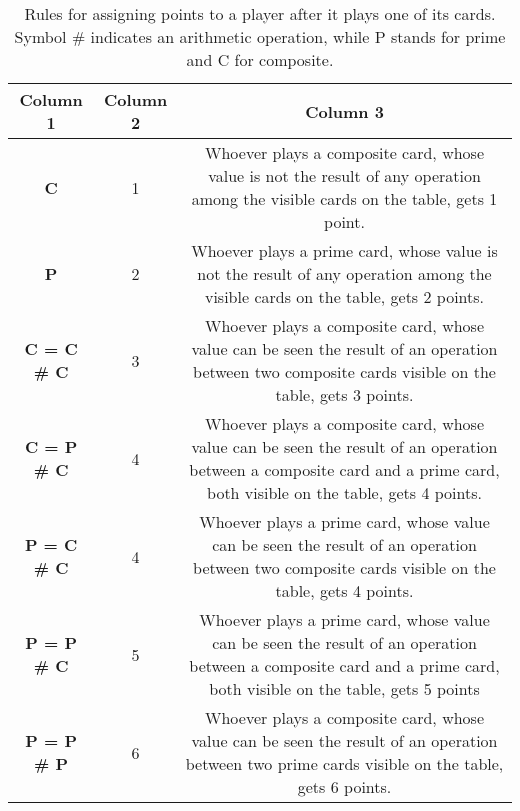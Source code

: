 \begin{table}[!ht]
	\setlength\extrarowheight{2pt} %
	\begin{tabularx}{\linewidth}{|c|c|C|}
		\hline
		\textbf{Column 1} & \textbf{Column 2} & \textbf{Column 3}  \\
		\hline
		
		\hline
		\textbf{C} & 1  &  Whoever plays a composite card, whose value is not the result of any operation among the visible cards on the table, gets 1 point. \\
		\hline
		\textbf{P}& 2 &  Whoever plays a prime card, whose value is not the result of any operation among the visible cards on the table, gets 2 points. \\
		\hline
		\textbf{C = C \# C}& 3 &  Whoever plays a composite card, whose value can be seen the result of an operation between two composite cards visible on the table, gets 3 points. \\
		\hline
		\textbf{C = P \# C}& 4 & Whoever plays a composite card, whose value can be seen the result of an operation between a composite card and a prime card, both visible on the table, gets 4 points. \\
		\hline
		\textbf{P = C \# C}& 4 &  Whoever plays a prime card, whose value can be seen the result of an operation between two composite cards visible on the table, gets 4 points. \\
		\hline
		\textbf{P = P \# C}& 5 & Whoever plays a prime card, whose value can be seen the result of an operation between a composite card and a prime card, both visible on the table, gets 5 points \\
		\hline
		\textbf{P = P \# P}& 6 & Whoever plays a composite card, whose value can be seen the result of an operation between two prime cards visible on the table, gets 6 points. \\
		\hline
	\end{tabularx}
	\label{tab:points}
	\caption{Rules for assigning points to a player after it plays one of its cards. Symbol $\#$ indicates an arithmetic operation, while P stands for prime and C for composite.}
\end{table}
